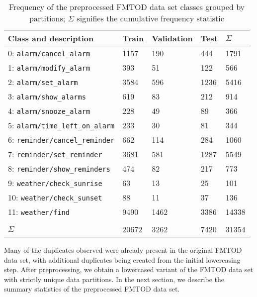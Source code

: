 \begin{table}[t!]
  \centering
  \begin{tabular}{lllll}
    \toprule
    Class and description & Train & Validation & Test & $\Sigma$ \\
    \midrule
    0: \texttt{alarm/cancel\_alarm} & 1157 & 190 & 444 & 1791 \\
    1: \texttt{alarm/modify\_alarm} & 393 & 51 & 122 & 566 \\
    2: \texttt{alarm/set\_alarm} & 3584 & 596 & 1236 & 5416 \\
    3: \texttt{alarm/show\_alarms} & 619 & 83 & 212 & 914 \\
    4: \texttt{alarm/snooze\_alarm} & 228 & 49 & 89 & 366 \\
    5: \texttt{alarm/time\_left\_on\_alarm} & 233 & 30 & 81 & 344 \\
    6: \texttt{reminder/cancel\_reminder} & 662 & 114 & 284 & 1060 \\
    7: \texttt{reminder/set\_reminder} & 3681 & 581 & 1287 & 5549 \\
    8: \texttt{reminder/show\_reminders} & 474 & 82 & 217 & 773 \\
    9: \texttt{weather/check\_sunrise} & 63 & 13 & 25 & 101 \\
    10: \texttt{weather/check\_sunset} & 88 & 11 & 37 & 136 \\
    11: \texttt{weather/find} & 9490 & 1462 & 3386 & 14338 \\[5pt]
    \hline \hline \\[-10pt]
    $\Sigma$ & 20672 & 3262 & 7420 & 31354 \\
    \bottomrule
  \end{tabular}
  \caption{Frequency of the preprocessed FMTOD data set classes grouped by
    partitions; $\Sigma$ signifies the cumulative frequency statistic}
  \label{tab:fmtod}
\end{table}

Many of the duplicates observed were already present in the original FMTOD data
set, with additional duplicates being created from the initial lowercasing step.
After preprocessing, we obtain a lowercased variant of the FMTOD data set with
strictly unique data partitions. In the next section, we describe the summary
statistics of the preprocessed FMTOD data set.

